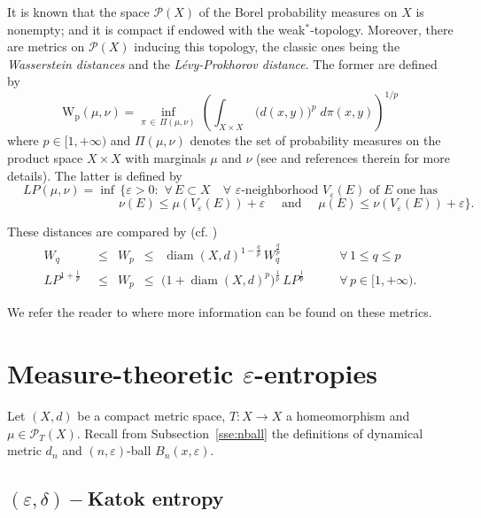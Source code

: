 \documentclass[11pt,a4paper,reqno]{amsart}
\theoremstyle{plain}
\theoremstyle{definition}
\newcommand{\ep} {\varepsilon}
\newcommand{\vep}{\varepsilon}
\newcommand{\cP}{{\mathcal P}}
\newcommand{\diam}{\operatorname{{diam}}}
\begin{document}
It is known that the space $\mathcal{P}(X)$ of the Borel probability measures on $X$ is nonempty; and it is compact if endowed with the weak$^*$-topology. Moreover, there are metrics on $\mathcal{P}(X)$ inducing this topology, the classic ones being the \emph{Wasserstein distances} and the \emph{L\'evy-Prokhorov distance}. The former are defined by
$$\mathrm{W_p}(\mu,\nu) = \inf_{\pi\,\in\,\Pi(\mu,\nu)}\,\left(\int_{X\times X}\,\big(d(x,y)\big)^p\;d\pi(x,y)\right)^{1/p}$$
where $p \in [1, +\infty)$ and $\Pi(\mu,\nu)$ denotes the set of probability measures on the product space $X\times X$ with marginals $\mu$ and $\nu$ (see \cite{Vi} and references therein for more details). The latter is defined by
$$LP(\mu,\nu) = \inf\,\Big\{\varepsilon > 0 \colon \,\, \forall\, E\subset X \quad  \forall\, \,\text{$\varepsilon$-neighborhood $V_\varepsilon(E)$ of $E$ one has} $$
$$\quad \quad \quad \quad \quad \quad \quad \quad \quad \nu(E)\leq \mu(V_\varepsilon(E))+\varepsilon \quad \text{ and } \quad \mu(E)\leq \nu(V_\varepsilon(E))+\varepsilon \Big\}.$$

\noindent These distances are compared by (cf. \cite[p.~11]{BB})
\begin{equation}\label{MetricRelations}
\begin{aligned}
W_q \,\,\,&\le \,\,\,W_p \,\,\,
\le \,\,\,\diam(X,d)^{1-\frac{q}{p}}\, W_q^{\frac{q}{p}}
\qquad & \forall\, 1 \le q \le p \\
LP^{1+\frac{1}{p}} \,\,&\le\,\,\, W_p\,\,\,
\le \,\,\bigl(1+\diam(X,d)^p\bigr)^{\frac{1}{p}}\, LP^{\frac{1}{p}} \qquad & \forall\, p \in [1, +\infty).
\end{aligned}
\end{equation}


\noindent We refer the reader to \cite{ GSu, Vi} where more information can be found on these metrics.


\section{Measure-theoretic $\vep$-entropies}\label{se:mte}

Let $(X,d)$ be a compact metric space, $T \colon X \to X$ a homeomorphism and $\mu \in \cP_T(X)$. Recall from Subsection~\ref{sse:nball} the definitions of dynamical metric $d_n$ and $(n, \varepsilon)$-ball $B_n(x,\vep)$.

\subsection{$(\ep,\delta)-$Katok entropy}\label{se:KE}
\end{document}

